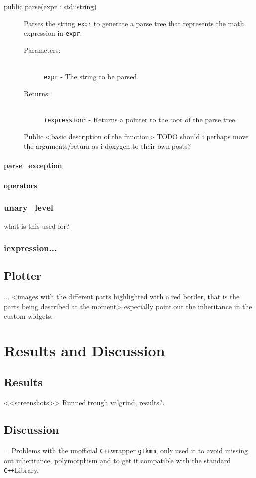 \documentclass[a4paper,11pt]{kth-mag}
\newcommand{\Cpp}{\texttt{C++}}
\newcommand{\Gtkmm}{\texttt{gtkmm}}
\begin{document}

\begin{description}
    \item[public parse(expr : std::string)] Parses the string \texttt{expr} to
    generate a parse tree that represents the math expression in \texttt{expr}.
    \begin{description}
            \item[Parameters:]~\\
                \verb+expr+ - The string to be parsed.
            \item[Returns:]~\\
                \verb+iexpression*+ - Returns a pointer to the root of the
                parse tree.

        \end{description}
        Public <basic description of the function> TODO should i perhaps move the arguments/return as i doxygen to their own posts?
\end{description}
\subsubsection{parse\_exception}
\subsubsection{operators}

\subsection{unary\_level}
what is this used for?
\subsection{iexpression...}

\section{Plotter}
...
<images with the different parts highlighted with a red border, that is the parts being described at the moment>
especially point out the inheritance in the custom widgets.

\chapter{Results and Discussion}

\section{Results}
<<screenshots>>
Runned trough valgrind, results?.

\section{Discussion}
 = Problems with the unofficial \Cpp wrapper \Gtkmm, only used it to avoid missing out inheritance, polymorphism and to get it compatible with the standard \Cpp Library. 
 
\end{document}
